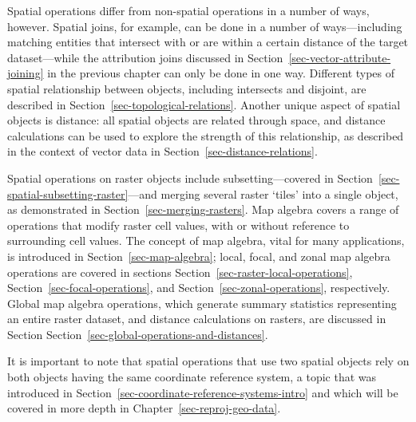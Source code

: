 \documentclass[
  letterpaper,
]{krantz}
\begin{document}
Spatial operations differ from non-spatial operations in a number of
ways, however. Spatial joins, for example, can be done in a number of
ways---including matching entities that intersect with or are within a
certain distance of the target dataset---while the attribution joins
discussed in Section~\ref{sec-vector-attribute-joining} in the previous
chapter can only be done in one way. Different types of spatial
relationship between objects, including intersects and disjoint, are
described in Section~\ref{sec-topological-relations}. Another unique
aspect of spatial objects is distance: all spatial objects are related
through space, and distance calculations can be used to explore the
strength of this relationship, as described in the context of vector
data in Section~\ref{sec-distance-relations}.

Spatial operations on raster objects include subsetting---covered in
Section~\ref{sec-spatial-subsetting-raster}---and merging several raster
`tiles' into a single object, as demonstrated in
Section~\ref{sec-merging-rasters}. Map algebra covers a range of
operations that modify raster cell values, with or without reference to
surrounding cell values. The concept of map algebra, vital for many
applications, is introduced in Section~\ref{sec-map-algebra}; local,
focal, and zonal map algebra operations are covered in sections
Section~\ref{sec-raster-local-operations},
Section~\ref{sec-focal-operations}, and
Section~\ref{sec-zonal-operations}, respectively. Global map algebra
operations, which generate summary statistics representing an entire
raster dataset, and distance calculations on rasters, are discussed in
Section Section~\ref{sec-global-operations-and-distances}.

\begin{tcolorbox}[enhanced jigsaw, title=\textcolor{quarto-callout-note-color}{\faInfo}\hspace{0.5em}{Note}, coltitle=black, colbacktitle=quarto-callout-note-color!10!white, breakable, titlerule=0mm, colframe=quarto-callout-note-color-frame, opacitybacktitle=0.6, colback=white, bottomrule=.15mm, left=2mm, leftrule=.75mm, toprule=.15mm, toptitle=1mm, bottomtitle=1mm, arc=.35mm, opacityback=0, rightrule=.15mm]

It is important to note that spatial operations that use two spatial
objects rely on both objects having the same coordinate reference
system, a topic that was introduced in
Section~\ref{sec-coordinate-reference-systems-intro} and which will be
covered in more depth in Chapter~\ref{sec-reproj-geo-data}.

\end{tcolorbox}
\end{document}
